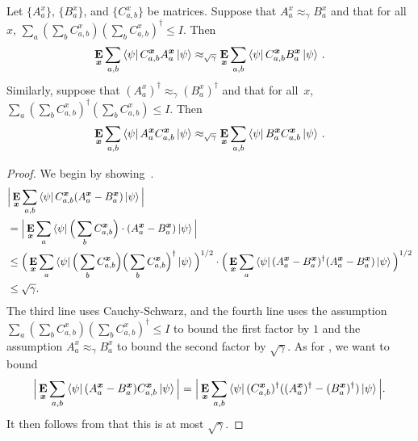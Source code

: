 \begin{proposition}
\label{prop:closeness-of-ip}
	Let $\{A^x_a\}$, $\{B^x_a\}$, and $\{C^x_{a,b} \}$ be matrices.
	Suppose that  $A^x_a \approx_\gamma B^x_a$ and that for all~$x$, $\sum_a (\sum_b C^x_{a,b}) (\sum_b C^x_{a,b})^\dagger  \leq I$. Then
	\begin{equation}
	\mathop{\bf E\/}_{{\boldsymbol{x}}} \sum_{a,b} \bra{\psi} C^{{\boldsymbol{x}}}_{a,b} A^{{\boldsymbol{x}}}_a  \ket{\psi} \approx_{\sqrt{\gamma}} \mathop{\bf E\/}_{{\boldsymbol{x}}} \sum_{a,b} \bra{\psi} C^{{\boldsymbol{x}}}_{a,b} B^{{\boldsymbol{x}}}_a  \ket{\psi} \,. \label{eq:closeness3}
	\end{equation}
	Similarly, suppose that  $(A^x_a)^\dagger \approx_\gamma (B^x_a)^\dagger$ and that for all~$x$, $\sum_a (\sum_b C^x_{a,b})^\dagger (\sum_b C^x_{a,b}) \leq I$. Then 
	\begin{equation}
	\mathop{\bf E\/}_{{\boldsymbol{x}}} \sum_{a,b} \bra{\psi} A^{{\boldsymbol{x}}}_a  C^{{\boldsymbol{x}}}_{a,b} \ket{\psi} \approx_{\sqrt{\gamma}} \mathop{\bf E\/}_{{\boldsymbol{x}}} \sum_{a,b} \bra{\psi} B^{{\boldsymbol{x}}}_a  C^{{\boldsymbol{x}}}_{a,b}  \ket{\psi} \,. \label{eq:closeness4}
	\end{equation}	
\end{proposition}
\begin{proof}
	We begin by showing~.
	\begin{align*}
		&\Big | \mathop{\bf E\/}_{{\boldsymbol{x}}} \sum_{a,b} \bra{\psi} C^{{\boldsymbol{x}}}_{a,b} (A^{{\boldsymbol{x}}}_a - B^{{\boldsymbol{x}}}_a) \ket{\psi} \Big | \\
		&= \Big | \mathop{\bf E\/}_{{\boldsymbol{x}}} \sum_{a} \bra{\psi} \Big ( \sum_b C^{{\boldsymbol{x}}}_{a,b} \Big ) \cdot (A^{{\boldsymbol{x}}}_a - B^{{\boldsymbol{x}}}_a) \ket{\psi} \Big |\\
		&\leq \Big ( \mathop{\bf E\/}_{{\boldsymbol{x}}} \sum_a \bra{\psi} \Big(\sum_b C^{{\boldsymbol{x}}}_{a,b}\Big) \Big(\sum_b C^{{\boldsymbol{x}}}_{a,b}\Big)^\dagger \ket{\psi} \Big )^{1/2} \cdot \Big ( \mathop{\bf E\/}_{{\boldsymbol{x}}} \sum_a \bra{\psi} (A^{{\boldsymbol{x}}}_a - B^{{\boldsymbol{x}}}_a)^\dagger  (A^{{\boldsymbol{x}}}_a - B^{{\boldsymbol{x}}}_a) \ket{\psi} \Big)^{1/2} \\
		&\leq \sqrt{\gamma}.
	\end{align*}
	The third line uses Cauchy-Schwarz, and the fourth line uses the assumption $\sum_a (\sum_b C^x_{a,b}) (\sum_b C^x_{a,b})^\dagger  \leq I$ to bound the first factor by $1$ and  the assumption $A^x_a \approx_\gamma B^x_a$ to bound the second factor by $\sqrt{\gamma}$.
	As for , we want to bound
	\begin{equation*}
	\Big | \mathop{\bf E\/}_{{\boldsymbol{x}}} \sum_{a,b} \bra{\psi} (A^{{\boldsymbol{x}}}_a - B^{{\boldsymbol{x}}}_a) C^{{\boldsymbol{x}}}_{a,b}  \ket{\psi} \Big |
	= \Big | \mathop{\bf E\/}_{{\boldsymbol{x}}} \sum_{a,b} \bra{\psi} (C^{{\boldsymbol{x}}}_{a,b})^\dagger ((A^{{\boldsymbol{x}}}_a)^\dagger - (B^{{\boldsymbol{x}}}_a)^\dagger) \ket{\psi} \Big |.
      \end{equation*}
      It then follows from  that this is at most $\sqrt{\gamma}$.
    \end{proof}
    
